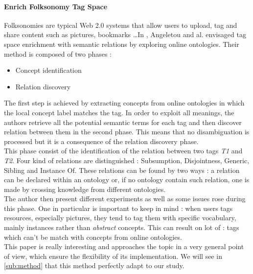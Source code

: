 \paragraph{Enrich Folksonomy Tag Space} %
\label{par:enrich_folksonomy_tag_space}
Folksonomies are typical Web 2.0 systems that allow users to upload, tag and share content such as pictures, bookmarks \dots In \cite{angel}, Angeletou and al. envisaged tag space enrichment with semantic relations by exploring online ontologies. Their method is composed of two phases :
\begin{itemize}
	\item Concept identification 
	\item Relation discovery
\end{itemize}
The first step is achieved by extracting concepts from online ontologies in which the local concept label matches the tag. In order to exploit all meanings, the authors retrieve all the potential semantic terms for each tag and then discover relation between them in the second phase. This means that no disambiguation is processed but it is a consequence of the relation discovery phase.\\
This phase consist of the identification of the relation between two tags \emph{T1} and \emph{T2}. Four kind of relations are distinguished : Subsumption, Disjointness, Generic, Sibling and Instance Of. These relations can be found by two ways : a relation can be declared within an ontology or, if no ontology contain such relation, one is made by crossing knowledge from different ontologies.\\

The author then present different experiments as well as some issues rose during this phase. One in particular is important to keep in mind : when users tags resources, especially pictures, they tend to tag them with specific vocabulary, mainly instances rather than \emph{abstract} concepts. This can result on lot of  : tags which can't be match with concepts from online ontologies.\\

This paper is really interesting and approaches the topic in a very general point of view, which ensure the flexibility of its implementation. We will see in \ref{sub:method} that this method perfectly adapt to our study. 

